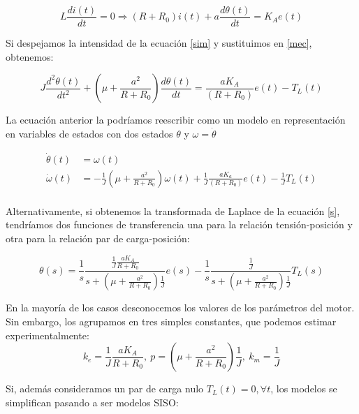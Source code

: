 \documentclass[10pt,a4paper]{report}
\begin{document}
 \begin{equation}\label{sim}
L\frac{di(t)}{dt}= 0 \Rightarrow (R+R_0)i(t)+a\frac{d\theta(t)}{dt} = K_Ae(t)
\end{equation}

Si despejamos la intensidad de la ecuación \ref{sim} y sustituimos en \ref{mec}, obtenemos:

\begin{equation}\label{s}
J\frac{d^2\theta(t)}{dt^2}+\left(\mu+\frac{a^2}{R+R_0}\right)\frac{d\theta(t)}{dt} = \frac{aK_A}{(R+R_0)}e(t)-T_L(t)
\end{equation}

La ecuación anterior la podríamos reescribir como un modelo en representación en variables de estados con dos estados $\theta$ y $\omega= \dot{\theta}$ 

\begin{align}
\dot{\theta}(t) &= \omega(t)\\
\dot{\omega}(t) &=-\frac{1}{J}\left(\mu+\frac{a^2}{R+R_0}\right)\omega(t)+\frac{1}{J}\frac{aK_a}{(R+R_0)}e(t)-\frac{1}{J}T_L(t)\\
\end{align}



Alternativamente, si obtenemos la transformada de Laplace de la ecuación \ref{s}, tendríamos dos funciones de transferencia una para la relación tensión-posición y otra para la relación par de carga-posición:

\begin{equation}
\theta(s) = \frac{1}{s}\frac{\frac{1}{J}\frac{aK_A}{R+R_0}}{s+\left(\mu+\frac{a^2}{R+R_0}\right)\frac{1}{J}}e(s)-\frac{1}{s}\frac{\frac{1}{J}}{s+\left(\mu+\frac{a^2}{R+R_0}\right)\frac{1}{J}}T_L(s)
\end{equation}

En la mayoría de los casos desconocemos los valores de los parámetros del motor. Sin embargo, los agrupamos en tres simples constantes, que podemos estimar experimentalmente:
\begin{equation}
k_e = \frac{1}{J}\frac{aK_A}{R+R_0},\ p = \left(\mu+\frac{a^2}{R+R_0}\right)\frac{1}{J},\ k_m = \frac{1}{J}
\end{equation}
 
Si, además consideramos un par de carga nulo $T_L(t) = 0, \forall t$, los modelos se simplifican pasando a ser modelos SISO:
\end{document}
